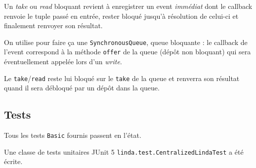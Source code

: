 \documentclass[headings=standardclasses,parskip=half]{scrartcl}
\begin{document}
Un \emph{take} ou \emph{read} bloquant revient à enregistrer un event
\emph{immédiat} dont le callback renvoie le tuple passé en entrée,
rester bloqué jusqu'à résolution de celui-ci et finalement renvoyer
son résultat.

On utilise pour faire ça une \texttt{SynchronousQueue}, queue bloquante :
le callback de l'event correspond à la méthode \texttt{offer} de la queue
(dépôt non bloquant) qui sera éventuellement appelée lors d'un \emph{write}.

Le \texttt{take}/\texttt{read} reste lui bloqué sur le \texttt{take} de la
queue et renverra son résultat quand il sera débloqué par un dépôt dans
la queue.

\subsection*{Tests}

Tous les tests \texttt{Basic} fournis passent en l'état.

Une classe de tests unitaires JUnit 5
\texttt{linda.test.CentralizedLindaTest} a été écrite.
\end{document}
